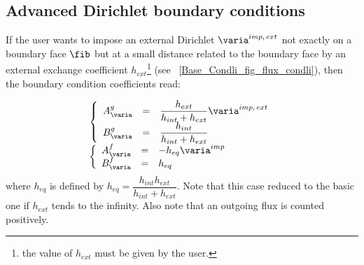 \subsection{Advanced Dirichlet boundary conditions}

If the user wants to impose an external Dirichlet $\varia^{imp, \, ext}$ not exactly on a boundary face $\fib$ but at a small distance
related to the boundary face by an external exchange coefficient $h_{ext}$\footnote{the value of $h_{ext}$ must be given by the user.}
 (see \figurename~\ref{Base_Condli_fig_flux_condli}), then  the boundary condition coefficients read:

\begin{equation}
\begin{array}{l}
\left\lbrace
\begin{array}{r c l}
A^g_\varia & = &\dfrac{h_{ext}}{h_{int}+h_{ext}} \varia^{imp, \, ext} \\
B^g_\varia & = & \dfrac{h_{int}}{h_{int}+h_{ext}}
\end{array}
\right.
\\
\left\lbrace
\begin{array}{r c l}
A^f_\varia & = & -h_{eq} \varia^{imp} \\
B^f_\varia & = & h_{eq}
\end{array}
\right.
\end{array}
\end{equation}
where $h_{eq} $ is defined by $h_{eq}=\dfrac{h_{int} h_{ext}}{ h_{int} + h_{ext}}$.
Note that this case reduced to the basic one if $h_{ext}$ tends to the infinity.
Also note that an outgoing flux is counted positively.



